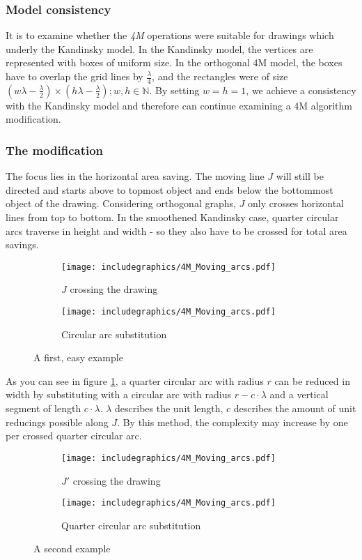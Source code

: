 \subsubsection*{Model consistency}
It is to examine whether the \textit{4M} operations were suitable for drawings which underly the Kandinsky model. In the Kandinsky model, the vertices are represented with boxes of uniform size. In the orthogonal 4M model, the boxes have to overlap the grid lines by $\frac{\lambda}{4}$, and the rectangles were of size $\left(w\lambda-\frac{\lambda}{2} \right)\times \left( h\lambda-\frac{\lambda}{2}\right);w,h\in\mathbb{N}$. By setting $w = h = 1$, we achieve a consistency with the Kandinsky model and therefore can continue examining a 4M algorithm modification.
\subsubsection*{The modification}
The focus lies in the horizontal area saving. The moving line $J$ will still be directed and starts above to topmost object and ends below the bottommost object of the drawing. Considering orthogonal graphs, $J$ only crosses horizontal lines from top to bottom. In the smoothened Kandinsky case, quarter circular arcs traverse in height and width - so they also have to be crossed for total area savings. 
\begin{figure}[H]
	\centering
	\begin{subfigure}{0.4\linewidth}
		\centering
		\texttt{[image: includegraphics/4M\_Moving\_arcs.pdf]}
		\caption{$J$ crossing the drawing}
	\end{subfigure}
	\begin{subfigure}{0.4\linewidth}
		\centering
		\texttt{[image: includegraphics/4M\_Moving\_arcs.pdf]}
		\caption{Circular arc substitution}
	\end{subfigure}
	\caption{A first, easy example}\label{im:arc-crossing_example1}
\end{figure}
As you can see in figure \ref{im:arc-crossing_example1}, a quarter circular arc with radius $r$ can be reduced in width by substituting with a circular arc with radius $r-c\cdot\lambda$ and a vertical segment of length $c\cdot\lambda$. $\lambda$ describes the unit length, $c$ describes the amount of unit reducings possible along $J$. By this method, the complexity may increase by one per crossed quarter circular arc. 
\begin{figure}[H]
	\centering
	\begin{subfigure}{0.4\linewidth}
		\centering
		\texttt{[image: includegraphics/4M\_Moving\_arcs.pdf]}
		\caption{$J'$ crossing the drawing}\label{im:arc-crossing_example2a}
	\end{subfigure}
	\begin{subfigure}{0.4\linewidth}
		\centering
		\texttt{[image: includegraphics/4M\_Moving\_arcs.pdf]}
		\caption{Quarter circular arc substitution}
	\end{subfigure}
	\caption{A second example}\label{im:arc-crossing_example2}
\end{figure}
